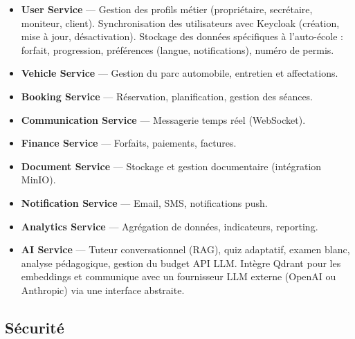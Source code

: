 \documentclass[12pt,a4paper]{article}
\newcommand{\role}[1]{\textbf{\color{accent}#1}}
\begin{document}
\begin{itemize}[leftmargin=*,itemsep=6pt]
    \item \role{User Service} --- Gestion des profils métier (propriétaire, secrétaire, moniteur, client). Synchronisation des utilisateurs avec Keycloak (création, mise à jour, désactivation). Stockage des données spécifiques à l'auto-école : forfait, progression, préférences (langue, notifications), numéro de permis.
    \item \role{Vehicle Service} --- Gestion du parc automobile, entretien et affectations.
    \item \role{Booking Service} --- Réservation, planification, gestion des séances.
    \item \role{Communication Service} --- Messagerie temps réel (WebSocket).
    \item \role{Finance Service} --- Forfaits, paiements, factures.
    \item \role{Document Service} --- Stockage et gestion documentaire (intégration MinIO).
    \item \role{Notification Service} --- Email, SMS, notifications push.
    \item \role{Analytics Service} --- Agrégation de données, indicateurs, reporting.
    \item \role{AI Service} --- Tuteur conversationnel (RAG), quiz adaptatif, examen blanc, analyse pédagogique, gestion du budget API LLM. Intègre Qdrant pour les embeddings et communique avec un fournisseur LLM externe (OpenAI ou Anthropic) via une interface abstraite.
\end{itemize}

\subsection{Sécurité}
\end{document}
